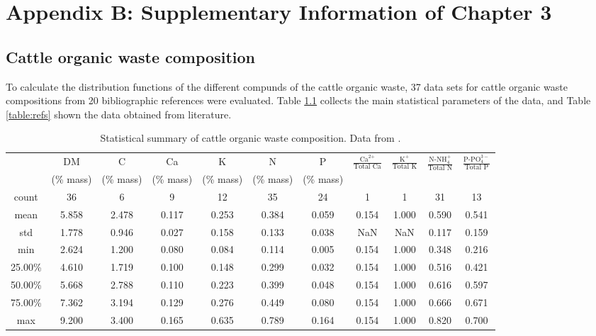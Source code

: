 \chapter{Appendix B: Supplementary Information of Chapter 3}

\begin{refsection}[referencesCh3]
\section{Cattle organic waste composition} \label{ApBcomp_dist}
To calculate the distribution functions of the different compunds of the cattle organic waste, 37 data sets for cattle organic waste compositions from 20 bibliographic references were evaluated. Table \ref{table:dig_compt_stats} collects the main statistical parameters of the data, and Table \ref{table:refs} shown the data obtained from literature.

\begin{table}
	\centering
	\caption{Statistical summary of cattle organic waste composition. Data from \protect\citep{Alburquerque,Bolzonella,Seppala,Gell,Normak,Sorensen,Tampere,Moset,Zheng,Xia,Moller,WRAP,ADAS,Risgberg,Ledda,Kirchmann,Moller2,Walsh,Loes,Martin2}.} \label{table:dig_compt_stats}
	\begin{tabular}{ c c c c c c c c c c c}
		\toprule
		&DM		&C		&Ca		&K		&N		&P		&\multirow{2}{*}{\Large{$\frac{\text{Ca}^{\text{2+}}}{\text{Total Ca}}$}}	&\multirow{2}{*}{\Large{$\frac{\text{K}^{\text{+}}}{\text{Total K}}$}}	&\multirow{2}{*}{\Large{$\frac{\text{N-NH}^{+}_{4}}{\text{Total N}}$}}	&\multirow{2}{*}{\Large{$\frac{\text{P-PO}^{3-}_{4}}{\text{Total P}}$}}	\\	
		&(\% mass)		&(\% mass)		&(\% mass)		&(\% mass)		&(\% mass)		&(\% mass)		&	&	&	&	\\ \midrule
		count		&36		&6		&9		&12		&35		&24		&1			&1		&31			&13			\\ 
		mean		&5.858	&2.478	&0.117	&0.253	&0.384	&0.059	&0.154		&1.000	&0.590		&0.541		\\ 
		std		&1.778	&0.946	&0.027	&0.158	&0.133	&0.038	&NaN		&NaN	&0.117		&0.159		\\ 
		min		&2.624	&1.200	&0.080	&0.084	&0.114	&0.005	&0.154		&1.000	&0.348		&0.216		\\ 
		25.00\%	&4.610	&1.719	&0.100	&0.148	&0.299	&0.032	&0.154		&1.000	&0.516		&0.421		\\ 
		50.00\%	&5.668	&2.788	&0.110	&0.223	&0.399	&0.048	&0.154		&1.000	&0.616		&0.597		\\ 
		75.00\%	&7.362	&3.194	&0.129	&0.276	&0.449	&0.080	&0.154		&1.000	&0.666		&0.671		\\ 
		max		&9.200	&3.400	&0.165	&0.635	&0.789	&0.164	&0.154		&1.000	&0.820		&0.700		\\ \bottomrule
	\end{tabular}
\end{table}


\end{refsection}
